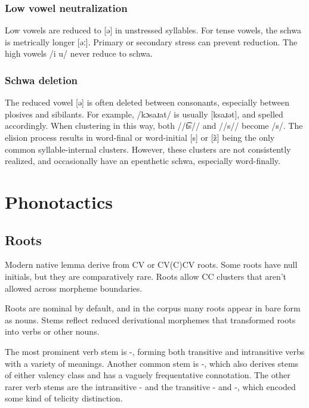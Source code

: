 \subsection{Low vowel neutralization} \label{sub:schwa_neutral}
Low vowels are reduced to [ə] in unstressed syllables. For tense vowels, the schwa is metrically longer [əː]. Primary or secondary stress can prevent reduction. The high vowels /i u/ never reduce to schwa.

\subsection{Schwa deletion} \label{sub:schwa_delete}
The reduced vowel [ə] is often deleted between consonants, especially between plosives and sibilants. For example,  /kɔsaɹat/ is usually [ksaɹət], and spelled accordingly. When clustering in this way, both //t͡s// and //s// become /s/. The elision process results in word-final or word-initial [s] or [z̃] being the only common syllable-internal clusters. However, these clusters are not consistently realized, and occasionally have an epenthetic schwa, especially word-finally. 

\setchapterpreamble[u]{\margintoc}
\chapter{Phonotactics}
\section{Roots}
Modern native lemma derive from CV or CV(C)CV roots. Some roots have null initials, but they are comparatively rare. Roots allow CC clusters that aren't allowed across morpheme boundaries.

Roots are nominal by default, and in the corpus many roots appear in bare form as nouns. Stems reflect reduced derivational morphemes that transformed roots into verbs or other nouns.

The most prominent verb stem is -, forming both transitive and intransitive verbs with a variety of meanings. Another common stem is -, which also derives stems of either valency class and has a vaguely frequentative connotation. The other rarer verb stems are the intransitive - and the transitive - and -, which encoded some kind of telicity distinction.

